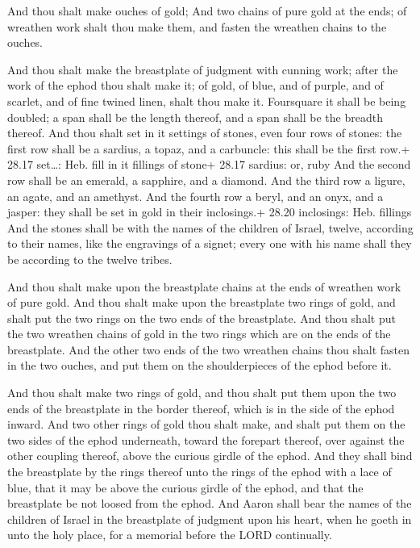  And thou shalt make ouches of gold;  And
two chains of pure gold at the ends; of wreathen work shalt thou make
them, and fasten the wreathen chains to the ouches.

 And thou shalt make the breastplate of judgment with
cunning work; after the work of the ephod thou shalt make it; of gold,
of blue, and of purple, and of scarlet, and of fine twined linen, shalt
thou make it.  Foursquare it shall be being doubled; a span
shall be the length thereof, and a span shall be the breadth thereof.
 And thou shalt set in it settings of stones, even four
rows of stones: the first row shall be a sardius, a topaz, and a
carbuncle: this shall be the first row.+ 28.17 set\ldots: Heb. fill in
it fillings of stone+ 28.17 sardius: or, ruby  And the
second row shall be an emerald, a sapphire, and a diamond. 
And the third row a ligure, an agate, and an amethyst.  And
the fourth row a beryl, and an onyx, and a jasper: they shall be set in
gold in their inclosings.+ 28.20 inclosings: Heb. fillings 
And the stones shall be with the names of the children of Israel,
twelve, according to their names, like the engravings of a signet; every
one with his name shall they be according to the twelve tribes.

 And thou shalt make upon the breastplate chains at the
ends of wreathen work of pure gold.  And thou shalt make
upon the breastplate two rings of gold, and shalt put the two rings on
the two ends of the breastplate.  And thou shalt put the
two wreathen chains of gold in the two rings which are on the ends of
the breastplate.  And the other two ends of the two
wreathen chains thou shalt fasten in the two ouches, and put them on the
shoulderpieces of the ephod before it.

 And thou shalt make two rings of gold, and thou shalt
put them upon the two ends of the breastplate in the border thereof,
which is in the side of the ephod inward.  And two other
rings of gold thou shalt make, and shalt put them on the two sides of
the ephod underneath, toward the forepart thereof, over against the
other coupling thereof, above the curious girdle of the ephod.
 And they shall bind the breastplate by the rings thereof
unto the rings of the ephod with a lace of blue, that it may be above
the curious girdle of the ephod, and that the breastplate be not loosed
from the ephod.  And Aaron shall bear the names of the
children of Israel in the breastplate of judgment upon his heart, when
he goeth in unto the holy place, for a memorial before the LORD
continually.

